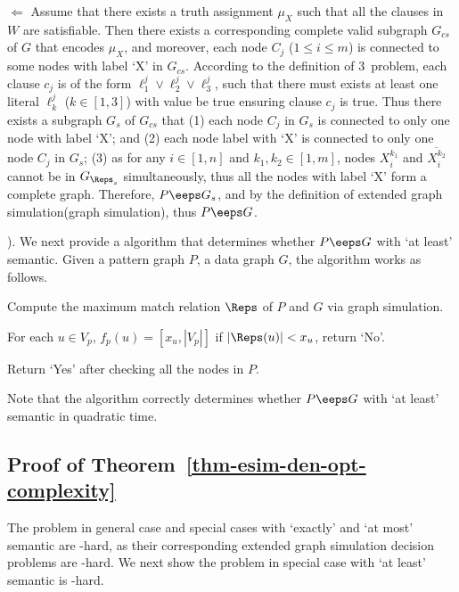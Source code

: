 \stab
$\Leftarrow$
Assume that there exists a truth assignment $\mu_X$ such that all the clauses in $W$ are satisfiable. Then there exists a corresponding complete valid subgraph $G_{cs}$ of
$G$ that encodes $\mu_X$, and moreover, each node $C_j$ ($1 \leq i \leq m$) is connected to some nodes with label `X' in $G_{cs}$. According to the definition of 3\SAT\ problem, each clause $c_j$ is of the form $\ell_1^j\vee \ell_2^j\vee \ell_3^j$, such that there must exists at least one literal $\ell_k^j$ ($k \in [1,3]$) with value be true ensuring clause $c_j$ is true. Thus there exists a subgraph $G_s$ of $G_{cs}$ that (1) each node $C_j$ in $G_s$ is connected to only one node with label `X'; and (2) each node label with `X' is connected to only one node $C_j$ in $G_s$; (3) as for any $i\in[1,n]$ and $k_1, k_2\in[1,m]$, nodes $X_i^{k_1}$ and $\overline{X_i^{k_2}}$ cannot be in $G_{\Reps_s}$ simultaneously, thus all the nodes with label `X' form a complete graph. Therefore, $P\eeps G_s$, and by the definition of extended graph simulation(graph simulation), thus $P\eeps G$.

\stab
\uppercase\expandafter{}). We next provide a \PTIME algorithm that determines whether $P \eeps G$ with `at least' semantic. Given a pattern graph $P$, a data graph $G$, the algorithm works as follows.
\be
\item Compute the maximum match relation $\Reps$ of $P$ and $G$ via graph simulation.
\item For each $u \in V_p$, $f_p(u)=[x_u,|V_p|]$  if $|\Reps(u)| < x_u$, return `No'.
\item Return `Yes' after checking all the nodes in $P$.
\ee

Note that the algorithm correctly determines whether $P \eeps G$ with `at least' semantic in quadratic time.

\subsection*{Proof of Theorem~\ref{thm-esim-den-opt-complexity}}

The problem in general case and special cases with `exactly' and `at most' semantic are \NP-hard, as their corresponding extended graph simulation decision problems are \NP-hard.
We next show the problem in special case with `at least' semantic is \NP-hard.

